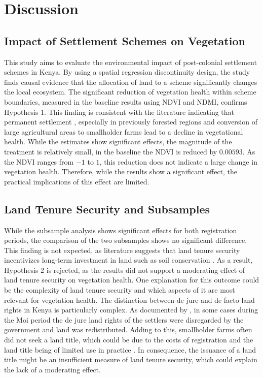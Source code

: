 \section{Discussion}
\label{sec:discussion}

\subsection{Impact of Settlement Schemes on Vegetation}
This study aims to evaluate the environmental impact of post-colonial settlement schemes in Kenya.
By using a spatial regression discontinuity design, the study finds causal evidence that the allocation of land to a scheme significantly changes the local ecosystem.
The significant reduction of vegetation health within scheme boundaries, measured in the baseline results using NDVI and NDMI, confirms Hypothesis 1.
This finding is consistent with the literature indicating that permanent settlement \parencite{serneelsProximateCausesLanduse2001}, especially in previously forested regions \parencite{kinyanjuiNDVIbasedVegetationMonitoring2011} and conversion of large agricultural areas to smallholder farms \parencite{gitauColonialeraSettlementsPostcolonial2025} lead to a decline in vegetational health.
While the estimates show significant effects, the magnitude of the treatment is relatively small, in the baseline the NDVI is reduced by $0.00593$.
As the NDVI ranges from $-1$ to $1$, this reduction does not indicate a large change in vegetation health.
Therefore, while the results show a significant effect, the practical implications of this effect are limited.

\subsection{Land Tenure Security and Subsamples}
While the subsample analysis shows significant effects for both registration periods, the comparison of the two subsamples shows no significant difference.
This finding is not expected, as literature suggests that land tenure security incentivizes long-term investment in land such as soil conservation \parencite{goldsteinProfitsPowerLand2008,deiningerOverlappingLandRights2008,besleyLandReformPoverty2000}.
As a result, Hypothesis 2 is rejected, as the results did not support a moderating effect of land tenure security on vegetation health.
One explanation for this outcome could be the complexity of land tenure security and which aspects of it are most relevant for vegetation health.
The distinction between de jure and de facto land rights in Kenya is particularly complex.
As documented by \cite{ndunguReportComissionInquiry2004,booneLandConflictDistributive2012}, in some cases during the Moi period the de jure land rights of the settlers were disregarded by the government and land was redistributed.
Adding to this, smallholder farms often did not seek a land title, which could be due to the costs of registration and the land title being of limited use in practice \parencite{placeEconomicEffectsLand1998}.
In consequence, the issuance of a land title might be an insufficient measure of land tenure security, which could explain the lack of a moderating effect.

